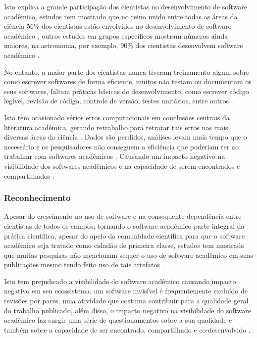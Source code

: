 Isto explica a grande participação dos cientistas no desenvolvimento de
software acadêmico, estudos tem mostrado que no reino unido entre todas as
áreas da ciência 56\% dos cientistas estão envolvidos no desenvolvimento de
software acadêmico \cite{hettrick2014uk}, outros estudos em grupos específicos mostram números ainda
maiores, na astronomia, por exemplo, 90\% dos cientistas desenvolvem software
acadêmico \cite{momcheva2015software}.

No entanto, a maior parte dos cientistas nunca tiveram treinamento algum sobre como escrever
softwares de forma eficiente, muitos não testam ou documentam os seus
softwares, faltam práticas básicas de desenvolvimento, como escrever código
legível, revisão de código, controle de versão, testes unitários, entre outros
\cite{wilson2017good}.

Isto tem ocasionado sérios erros computacionais em conclusões centrais da
literatura acadêmica, gerando retrabalho para retratar tais erros nas mais
diversas áreas da ciência \cite{merali2010computational}.
Dados são perdidos, análises levam mais tempo que o necessário e os
pesquisadores não conseguem a eficiência que poderiam ter ao trabalhar com
softwares acadêmicos \cite{wilson2017good}.
Causando um impacto negativo na visibilidade dos softwares acadêmicos e na
capacidade de serem encontrados e compartilhados \cite{howison2013incentives,
katz2014transitive}.

\subsubsection{Reconhecimento}


Apesar do crescimento no uso de software e na consequente dependência entre
cientistas de todos os campos, tornando o software acadêmico parte integral da
prática científica, apesar do apelo da comunidade científica para que o
software acadêmico seja tratado como cidadão de primeira classe, estudos tem
mostrado que muitas pesquisas não mencionam sequer o uso de software acadêmico
em suas publicações mesmo tendo feito uso de tais artefatos
\cite{momcheva2015software} \cite{howison2016software}.

Isto tem prejudicado a visibilidade do software acadêmico causando impacto
negativo em seu ecossistema, um software invisível é frequentemente excluído de
revisões por pares, uma atividade que costuma contribuir para a qualidade geral
do trabalho publicado, além disso, o
impacto negativo na visibilidade do software acadêmico faz surgir uma
série de questionamentos sobre a sua qualidade e também sobre a
capacidade de ser encontrado, compartilhado e co-desenvolvido
\cite{howison2013incentives, katz2014transitive} \cite{howison2016software}.


